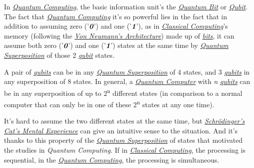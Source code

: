 \documentclass[conference]{IEEEtran}
\begin{document}
\vspace{4pt}

In \href{https://en.wikipedia.org/wiki/Quantum_computing}{\textit{Quantum Computing}}, the basic information unit's the \href{https://en.wikipedia.org/wiki/Qubit}{\textit{Quantum Bit}} or \href{https://en.wikipedia.org/wiki/Qubit}{\textit{Qubit}}. The fact that \href{https://en.wikipedia.org/wiki/Quantum_computing}{\textit{Quantum Computing}} it's so powerful lies in the fact that in addition to assuming zero ('$\textit{\textbf{0}}$') and one ('$\textit{\textbf{1}}$'), as in \href{https://en.wikipedia.org/wiki/Von_Neumann_architecture}{\textit{Classical Computing}}'s memory (following the \href{https://en.wikipedia.org/wiki/Von_Neumann_architecture}{\textit{Von Neumann's Architecture}}) made up of \href{https://en.wikipedia.org/wiki/Bit}{\textit{bits}}, it can assume both zero ('$\textit{\textbf{0}}$') and one ('$\textit{\textbf{1}}$') states at the same time by \href{https://en.wikipedia.org/wiki/Quantum_superposition}{\textit{Quantum Superposition}} of those 2 \href{https://en.wikipedia.org/wiki/Qubit}{\textit{qubit}} states.

\vspace{4pt}

A pair of \href{https://en.wikipedia.org/wiki/Qubit}{\textit{qubits}} can be in any \href{https://en.wikipedia.org/wiki/Quantum_superposition}{\textit{Quantum Superposition}} of 4 states, and 3 \href{https://en.wikipedia.org/wiki/Qubit}{\textit{qubits}} in any superposition of 8 states. In general, a \href{https://en.wikipedia.org/wiki/Quantum_computing}{\textit{Quantum Computer}} with \textit{n \href{https://en.wikipedia.org/wiki/Qubit}{qubits}} can be in any superposition of up to 2\textsuperscript{n} different states (in comparison to a normal computer that can only be in one of these 2\textsuperscript{n} states at any one time).

\vspace{4pt}

It's hard to assume the two different states at the same time, but \href{https://en.wikipedia.org/wiki/Schr\%C3\%B6dinger\%27s_cat}{\textit{Schr\"odinger's Cat's Mental Experience}} can give an intuitive sense to the situation. And it's thanks to this property of the \href{https://en.wikipedia.org/wiki/Quantum_superposition}{\textit{Quantum Superposition}} of states that motivated the studies in \textit{Quantum Computing}. If in \href{https://en.wikipedia.org/wiki/Von_Neumann_architecture}{\textit{Classical Computing}}, the processing is sequential, in the \href{https://en.wikipedia.org/wiki/Quantum_computing}{\textit{Quantum Computing}}, the processing is simultaneous.
\end{document}
